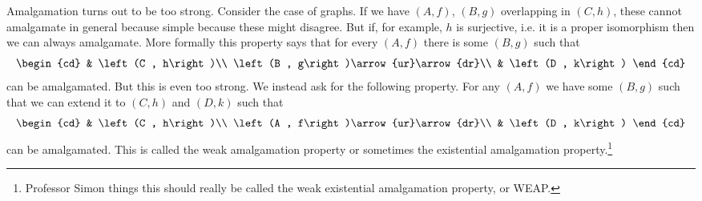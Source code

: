 \documentclass{amsart}
\begin{document}
Amalgamation turns out to be too strong. Consider the case of graphs. If we have $\left(A
, f\right)$, $\left(B , g\right)$
overlapping in $\left(C , h\right)$, these cannot amalgamate in general because simple
because these might disagree. But if, for example, $h$ is surjective, i.e. it is a proper
isomorphism then we can always amalgamate. 
More formally this property says that for every $\left(A , f\right)$ there is some
$\left(B , g\right)$ such that
\begin{equation}
\begin{cd}
& \left(C , h\right)\\
\left(B , g\right)\arrow{ur}\arrow{dr}\\
& \left(D , k\right)
\end{cd}
\end{equation}
can be amalgamated. But this is even too strong. We instead ask for the following
property. For any $\left(A , f\right)$ we have some $\left(B , g\right)$ such that we can
extend it to $\left(C , h\right)$ and $\left(D,k\right)$ such that
\begin{equation}
\begin{cd}
& \left(C , h\right)\\
\left(A , f\right)\arrow{ur}\arrow{dr}\\
& \left(D , k\right)
\end{cd}
\end{equation}
can be amalgamated.
This is called the weak amalgamation property or sometimes the
existential amalgamation property.\footnote{Professor Simon things this should really be
called the weak existential amalgamation property, or WEAP.}
\end{document}
